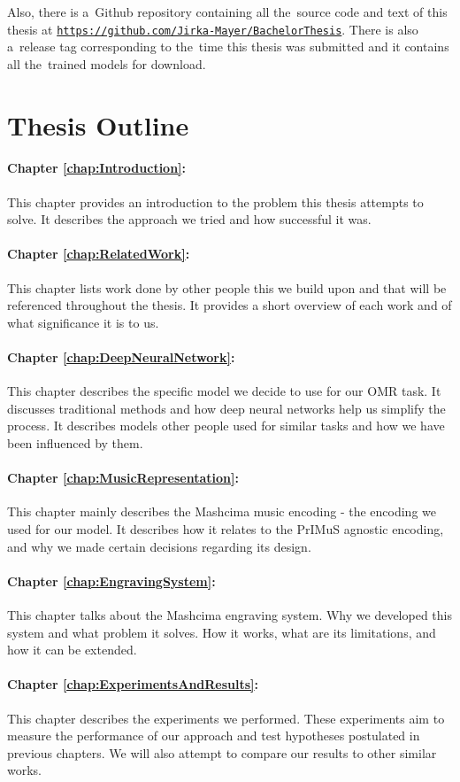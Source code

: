 Also, there is a~Github repository containing all the~source code and text of this thesis at \href{https://github.com/Jirka-Mayer/BachelorThesis}{\texttt{https://github.com/Jirka-Mayer/BachelorThesis}}. There is also a~release tag corresponding to the~time this thesis was submitted and it contains all the~trained models for download.

\section{Thesis Outline}

\paragraph{Chapter \ref{chap:Introduction}:} This chapter provides an introduction to the problem this thesis attempts to solve. It describes the approach we tried and how successful it was.

\paragraph{Chapter \ref{chap:RelatedWork}:} This chapter lists work done by other people this we build upon and that will be referenced throughout the thesis. It provides a short overview of each work and of what significance it is to us.

\paragraph{Chapter \ref{chap:DeepNeuralNetwork}:} This chapter describes the specific model we decide to use for our OMR task. It discusses traditional methods and how deep neural networks help us simplify the process. It describes models other people used for similar tasks and how we have been influenced by them.

\paragraph{Chapter \ref{chap:MusicRepresentation}:} This chapter mainly describes the Mashcima music encoding - the encoding we used for our model. It describes how it relates to the PrIMuS agnostic encoding, and why we made certain decisions regarding its design.

\paragraph{Chapter \ref{chap:EngravingSystem}:} This chapter talks about the Mashcima engraving system. Why we developed this system and what problem it solves. How it works, what are its limitations, and how it can be extended.

\paragraph{Chapter \ref{chap:ExperimentsAndResults}:} This chapter describes the experiments we performed. These experiments aim to measure the performance of our approach and test hypotheses postulated in previous chapters. We will also attempt to compare our results to other similar works.
